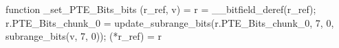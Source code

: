 function _set_PTE_Bits_bits (r_ref, v) = {
    r = __bitfield_deref(r_ref);
    r.PTE_Bits_chunk_0 = update_subrange_bits(r.PTE_Bits_chunk_0, 7, 0, subrange_bits(v, 7, 0));
    (*r_ref) = r
}
